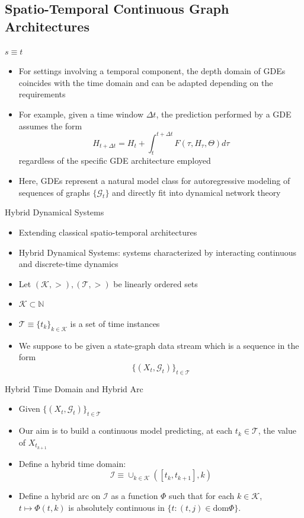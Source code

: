 \documentclass{beamer}
\begin{document}
\subsection{Spatio-Temporal Continuous Graph Architectures}
\begin{frame}{$s\equiv t$}
\begin{itemize}
\item For settings involving a temporal component, the depth domain of GDEs coincides with the time domain and can be adapted depending on the requirements
\item For example, given a time window $\Delta t$, the prediction performed by a GDE assumes the form\[
H_{t+\Delta t}=H_t+\int_t^{t+\Delta t}F(\tau,H_\tau,\Theta)d\tau
\]regardless of the specific GDE architecture employed
\item Here, GDEs represent a natural model class for autoregressive modeling of sequences of graphs $\{\mathcal G_t\}$ and directly fit into dynamical network theory
\end{itemize}
\end{frame}

\begin{frame}{Hybrid Dynamical Systems}
\begin{itemize}
\item Extending classical spatio-temporal architectures
\item Hybrid Dynamical Systems: systems characterized by interacting continuous and discrete-time dynamics
\item Let $(\mathcal{K},>), (\mathcal{T},>)$ be linearly ordered sets
\item $\mathcal{K}\subset\mathbb{N}$
\item $\mathcal{T}\equiv\{t_k\}_{k\in\mathcal K}$ is a set of time instances
\item We suppose to be given a state-graph data stream which is a sequence in the form\[
\{(X_t,\mathcal{G}_t)\}_{t\in\mathcal{T}}
\]
\end{itemize}
\end{frame}

\begin{frame}{Hybrid Time Domain and Hybrid Arc}
\begin{itemize}
\item Given $\{(X_t,\mathcal{G}_t)\}_{t\in\mathcal{T}}$
\item Our aim is to build a continuous model predicting, at each $t_k\in\mathcal{T}$, the value of $X_{t_{k+1}}$
\item Define a hybrid time domain:\[
\mathcal{I}\equiv\cup_{k\in\mathcal{K}}([t_k,t_{k+1}],k)
\]
\item Define a hybrid arc on $\mathcal{I}$ as a function $\Phi$ such that for each $k\in\mathcal K$, $t\mapsto\Phi(t,k)$ is absolutely continuous in $\{t:(t,j)\in\text{dom}\Phi\}$.
\end{itemize}
\end{frame}
\end{document}
